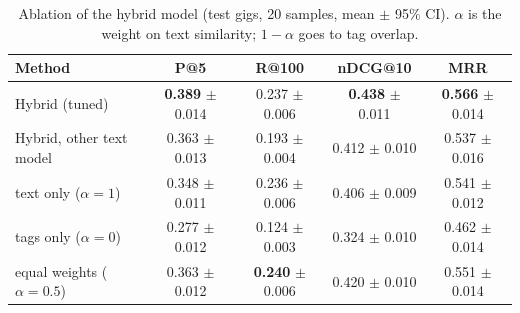 \begin{table}[htbp]
\centering
\small
\caption{Ablation of the hybrid model (test gigs, 20 samples, mean $\pm$ 95\% CI). $\alpha$ is the weight on text similarity; $1-\alpha$ goes to tag overlap.}
\label{tab:ablation}
\begin{tabular}{lcccc}
\toprule
Method & P@5 & R@100 & nDCG@10 & MRR \\
\midrule
Hybrid (tuned) & \textbf{0.389} $\pm$ 0.014 & 0.237 $\pm$ 0.006 & \textbf{0.438} $\pm$ 0.011 & \textbf{0.566} $\pm$ 0.014 \\
Hybrid, other text model & 0.363 $\pm$ 0.013 & 0.193 $\pm$ 0.004 & 0.412 $\pm$ 0.010 & 0.537 $\pm$ 0.016 \\
text only ($\alpha = 1$) & 0.348 $\pm$ 0.011 & 0.236 $\pm$ 0.006 & 0.406 $\pm$ 0.009 & 0.541 $\pm$ 0.012 \\
tags only ($\alpha = 0$) & 0.277 $\pm$ 0.012 & 0.124 $\pm$ 0.003 & 0.324 $\pm$ 0.010 & 0.462 $\pm$ 0.014 \\
equal weights ($\alpha = 0.5$) & 0.363 $\pm$ 0.012 & \textbf{0.240} $\pm$ 0.006 & 0.420 $\pm$ 0.010 & 0.551 $\pm$ 0.014 \\
\bottomrule
\end{tabular}
\end{table}
